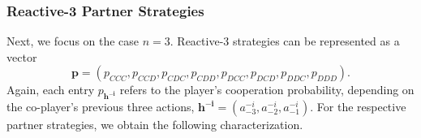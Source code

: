 \documentclass[9pt,twoside,lineno]{pnas-new}
\theoremstyle{plainCl1}
\newtheorem{corollary}{Corollary}
\theoremstyle{plainCl2}
\begin{document}


\subsubsection*{Reactive-3 Partner Strategies}
Next, we focus on the case $n\!=\!3$. Reactive-3 strategies can be represented as a vector 
$$\mathbf{p}=(p_{CCC}, p_{CCD}, p_{CDC}, p_{CDD}, p_{DCC}, p_{DCD}, p_{DDC}, p_{DDD}).$$
Again, each entry $p_\mathbf{h^{-i}}$ refers to the player's cooperation probability, depending on the co-player's previous three actions, $\mathbf{h^{-i}}\!=\!(a^{-i}_{-3}, a^{-i}_{-2}, a^{-i}_{-1})$.
For the respective partner strategies, we obtain the following characterization. 
\end{document}
